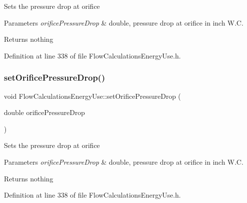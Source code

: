 Sets the pressure drop at orifice


\begin{DoxyParams}{Parameters}
{\em orifice\+Pressure\+Drop} & double, pressure drop at orifice in inch W.\+C.\\
\hline
\end{DoxyParams}
\begin{DoxyReturn}{Returns}
nothing 
\end{DoxyReturn}


Definition at line 338 of file Flow\+Calculations\+Energy\+Use.\+h.

\mbox{\label{class_flow_calculations_energy_use_ad4b324ecd8288d44c32d622bb26b1bff}} 
\subsubsection{\texorpdfstring{set\+Orifice\+Pressure\+Drop()}{setOrificePressureDrop()}\hspace{0.1cm}{\footnotesize\ttfamily [3/3]}}
{\footnotesize\ttfamily void Flow\+Calculations\+Energy\+Use\+::set\+Orifice\+Pressure\+Drop (\begin{DoxyParamCaption}\item[{double}]{orifice\+Pressure\+Drop }\end{DoxyParamCaption})\hspace{0.3cm}{\ttfamily [inline]}}

Sets the pressure drop at orifice


\begin{DoxyParams}{Parameters}
{\em orifice\+Pressure\+Drop} & double, pressure drop at orifice in inch W.\+C.\\
\hline
\end{DoxyParams}
\begin{DoxyReturn}{Returns}
nothing 
\end{DoxyReturn}


Definition at line 338 of file Flow\+Calculations\+Energy\+Use.\+h.

\mbox{\label{class_flow_calculations_energy_use_add93257048914dbd920b6dc2be431b69}} 
